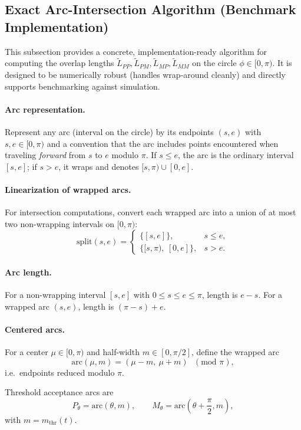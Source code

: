 \subsection{Exact Arc-Intersection Algorithm (Benchmark Implementation)}
\label{app:arc-algorithm}

This subsection provides a concrete, implementation-ready algorithm for computing the overlap lengths
$\tilde L_{PP},\tilde L_{PM},\tilde L_{MP},\tilde L_{MM}$ on the circle $\phi\in[0,\pi)$.
It is designed to be numerically robust (handles wrap-around cleanly) and directly supports benchmarking
against simulation.

\paragraph{Arc representation.}
Represent any arc (interval on the circle) by its endpoints $(s,e)$ with $s,e\in[0,\pi)$ and
a convention that the arc includes points encountered when traveling \emph{forward} from $s$ to $e$
modulo $\pi$.
If $s\le e$, the arc is the ordinary interval $[s,e]$; if $s>e$, it wraps and denotes $[s,\pi)\cup[0,e]$.

\paragraph{Linearization of wrapped arcs.}
For intersection computations, convert each wrapped arc into a union of at most two non-wrapping intervals on $[0,\pi)$:
\[
\mathrm{split}(s,e)=
\begin{cases}
\{[s,e]\}, & s\le e,\\
\{[s,\pi),\ [0,e]\}, & s>e.
\end{cases}
\]

\paragraph{Arc length.}
For a non-wrapping interval $[s,e]$ with $0\le s\le e\le \pi$, length is $e-s$.
For a wrapped arc $(s,e)$, length is $(\pi-s)+e$.

\paragraph{Centered arcs.}
For a center $\mu\in[0,\pi)$ and half-width $m\in[0,\pi/2]$, define the wrapped arc
\[
\mathrm{arc}(\mu,m) = (\mu-m,\ \mu+m)\ \ \ (\text{mod }\pi),
\]
i.e.\ endpoints reduced modulo $\pi$.

Threshold acceptance arcs are
\[
P_\theta=\mathrm{arc}(\theta,m),\qquad
M_\theta=\mathrm{arc}\!\left(\theta+\frac{\pi}{2},m\right),
\]
with $m=m_{\mathrm{thr}}(t)$.

